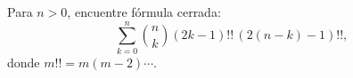 Para \(n>0\), encuentre fórmula cerrada:
\[\sum_{k=0}^n \binom{n}{k}(2k-1)!!\,(2(n-k)-1)!!,\]
donde \(m!! = m(m-2)\cdots\).
